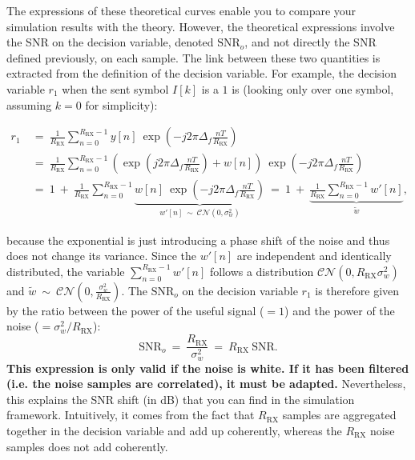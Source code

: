 The expressions of these theoretical curves enable you to compare your simulation results with the theory. However, the theoretical expressions involve the SNR on the decision variable, denoted $\text{SNR}_o$, and not directly the SNR defined previously, on each sample. The link between these two quantities is extracted from the definition of the decision variable. For example, the decision variable $r_1$ when the sent symbol $I[k]$ is a $1$ is (looking only over one symbol, assuming $k=0$ for simplicity):
\begin{small}
\begin{align*}
    r_1\: &= \:\frac{1}{R_{\text{RX}}}\sum_{n=0}^{R_{\text{RX}}-1} y[n] \:\exp \left(-j2\pi \Delta_f \frac{nT}{R_{\text{RX}}}\right)\\
    &=\:\frac{1}{R_{\text{RX}}}\sum_{n=0}^{R_{\text{RX}}-1} \left(\exp \left(j2\pi \Delta_f \frac{nT}{R_{\text{RX}}}\right)+w[n]\right) \:\exp \left(-j2\pi \Delta_f  \frac{nT}{R_{\text{RX}}}\right)\\
    &=\:1\:+\:\frac{1}{R_{\text{RX}}}\sum_{n=0}^{R_{\text{RX}}-1} \underbrace{w[n] \:\exp \left(-j2\pi \Delta_f \frac{nT}{R_{\text{RX}}}\right)}_{w'[n] \:\sim\: \mathcal{CN}(0,\sigma_w^2)}\:=\:1\:+\:\underbrace{\frac{1}{R_{\text{RX}}}\sum_{n=0}^{R_{\text{RX}}-1} w'[n]}_{\tilde{w}},
\end{align*}
\end{small}
because the exponential is just introducing a phase shift of the noise and thus does not change its variance. Since the $w'[n]$ are independent and identically distributed, the variable $\sum_{n=0}^{R_{\text{RX}}-1} w'[n]$ follows a distribution $\mathcal{CN}(0,R_{\text{RX}}\sigma_w^2)$ and $\tilde{w}\:\sim\:\mathcal{CN}(0,\frac{\sigma_w^2}{R_{\text{RX}}})$. The $\text{SNR}_o$ on the decision variable $r_1$ is therefore given by the ratio between the power of the useful signal ($=1$) and the power of the noise ($=\sigma_w^2/R_{\text{RX}}$):
\begin{equation*}
    \text{SNR}_{o}\:=\:\frac{R_{\text{RX}}}{\sigma_w^2}\:=\:R_{\text{RX}}\: \text{SNR}.
\end{equation*}
\textbf{This expression is only valid if the noise is white. If it has been filtered (i.e. the noise samples are correlated), it must be adapted.} Nevertheless,
this explains the SNR shift (in dB) that you can find in the simulation framework. Intuitively, it comes from the fact that $R_{\text{RX}}$ samples are aggregated together in the decision variable and add up coherently, whereas the $R_{\text{RX}}$ noise samples does not add coherently.


